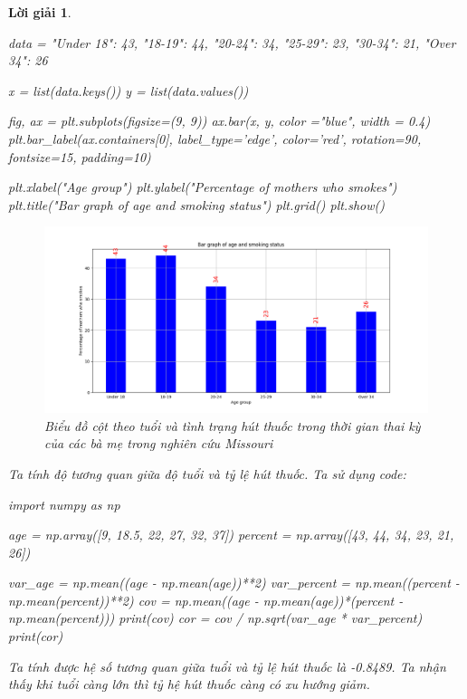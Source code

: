 \documentclass[14pt, a4paper]{article}
\theoremstyle{sltheorem}
\theoremstyle{soltheorem}
\newtheorem*{loigiai}{Lời giải}
\begin{document}
\begin{loigiai}
\begin{enumerate}[wide, labelwidth=!, labelindent=0pt,label=\textbf{\arabic*}.]
\begin{python}
data = {"Under 18": 43, "18-19": 44, "20-24": 34, "25-29": 23, "30-34": 21, "Over 34": 26}

x = list(data.keys())
y = list(data.values())

fig, ax = plt.subplots(figsize=(9, 9))
ax.bar(x, y, color ="blue", width = 0.4)
plt.bar_label(ax.containers[0], label_type='edge', color='red', rotation=90, fontsize=15, padding=10)
 
plt.xlabel("Age group")
plt.ylabel("Percentage of mothers who smokes")
plt.title("Bar graph of age and smoking status")
plt.grid()
plt.show()
        \end{python}

        \begin{figure}[h!]
            \centering
            \includegraphics[scale=0.4]{11.png}
            \caption{Biểu đồ cột theo tuổi và tình trạng hút thuốc trong thời gian thai kỳ của các bà mẹ trong nghiên cứu Missouri}
        \end{figure}

        Ta tính độ tương quan giữa độ tuổi và tỷ lệ hút thuốc. Ta sử dụng code:

        \begin{python}
import numpy as np

age = np.array([9, 18.5, 22, 27, 32, 37])
percent = np.array([43, 44, 34, 23, 21, 26])

var_age = np.mean((age - np.mean(age))**2)
var_percent = np.mean((percent - np.mean(percent))**2)
cov = np.mean((age - np.mean(age))*(percent - np.mean(percent)))
print(cov)
cor = cov / np.sqrt(var_age * var_percent)
print(cor)
        \end{python}

        Ta tính được hệ số tương quan giữa tuổi và tỷ lệ hút thuốc là -0.8489.
        Ta nhận thấy khi tuổi càng lớn thì tỷ hệ hút thuốc càng có xu hướng giảm.


\end{enumerate}
\end{loigiai}
\end{document}
